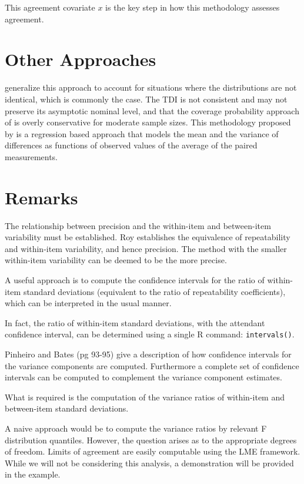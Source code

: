 \documentclass[12pt, a4paper]{report}
\theoremstyle{plain}
\theoremstyle{definition}
\theoremstyle{remark}
\begin{document}
This agreement covariate $x$ is the key step in how this
methodology assesses agreement.




\section{Other Approaches}


\citet{pkcng} generalize this approach to account for situations
where the distributions are not identical, which is commonly the
case. The TDI is not consistent and may not preserve its
asymptotic nominal level, and that the coverage probability
approach of \citet{lin2002} is overly conservative for moderate
sample sizes. This methodology proposed by \citet{pkcng} is a
regression based approach that models the mean and the variance of
differences as functions of observed values of the average of the
paired measurements.

\section{Remarks}
The relationship between precision and the within-item and between-item variability must be established. Roy establishes the equivalence of repeatability and within-item variability, and hence precision.  The method with the smaller within-item variability can be deemed to be the more precise.

A useful approach is to compute the confidence intervals for the ratio of within-item standard deviations (equivalent to the ratio of repeatability coefficients), which can be interpreted in the usual manner.  

In fact, the ratio of within-item standard deviations, with the attendant confidence interval,  can be determined using a single R command: \texttt{intervals()}.

Pinheiro and Bates (pg 93-95) give a description of how confidence intervals for the variance components are computed. Furthermore a complete set of confidence intervals can be computed to complement the variance component estimates. 

What is required is the computation of the variance ratios of within-item and between-item standard deviations.  

A naive  approach would be to compute the variance ratios by relevant F distribution quantiles. However, the question arises as to the appropriate degrees of freedom.
Limits of agreement are easily computable using the LME framework. While we will not be considering this analysis, a demonstration will be provided in the example.
\end{document}

